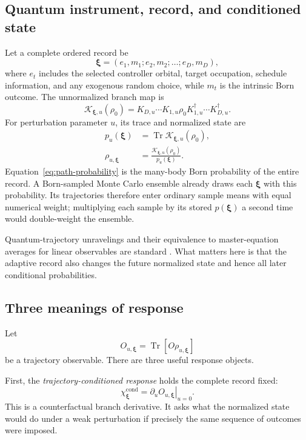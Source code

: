 \documentclass[aps,prb,onecolumn,nofootinbib,superscriptaddress]{revtex4-2}
\newcommand{\Tr}{\operatorname{Tr}}
\newcommand{\cK}{\mathcal{K}}
\newcommand{\bxi}{\bm{\xi}}
\newcommand{\cond}{\mathrm{cond}}
\begin{document}
\subsection{Quantum instrument, record, and conditioned state}

Let a complete ordered record be
\begin{equation}
  \bxi=(e_1,m_1;e_2,m_2;\ldots;e_D,m_D),
\end{equation}
where $e_t$ includes the selected controller orbital, target occupation,
schedule information, and any exogenous random choice, while $m_t$ is the
intrinsic Born outcome.  The unnormalized branch map is
\begin{equation}
  \cK_{\bxi,u}(\rho_0)
  =K_{D,u}\cdots K_{1,u}\rho_0
   K_{1,u}^{\dagger}\cdots K_{D,u}^{\dagger} .
\end{equation}
For perturbation parameter $u$, its trace and normalized state are
\begin{align}
  p_u(\bxi)&=\Tr\cK_{\bxi,u}(\rho_0),\label{eq:path-probability}\\
  \rho_{u,\bxi}&=\frac{\cK_{\bxi,u}(\rho_0)}{p_u(\bxi)} .
  \label{eq:conditional-state}
\end{align}
Equation~\eqref{eq:path-probability} is the many-body Born probability of the
entire record.  A Born-sampled Monte Carlo ensemble already draws each $\bxi$
with this probability.  Its trajectories therefore enter ordinary sample
means with equal numerical weight; multiplying each sample by its stored
$p(\bxi)$ a second time would double-weight the ensemble.

Quantum-trajectory unravelings and their equivalence to master-equation
averages for linear observables are standard
\cite{DalibardCastinMolmer1992,CarischRomitoZilberberg2023}.  What matters here
is that the adaptive record also changes the future normalized state and hence
all later conditional probabilities.

\subsection{Three meanings of response}

Let
\begin{equation}
  O_{u,\bxi}=\Tr[O\rho_{u,\bxi}]
\end{equation}
be a trajectory observable.  There are three useful response objects.

First, the \emph{trajectory-conditioned response} holds the complete record
fixed:
\begin{equation}
  \chi_{\bxi}^{\cond}
  =\left.\partial_u O_{u,\bxi}\right|_{u=0}.
  \label{eq:conditional-response}
\end{equation}
This is a counterfactual branch derivative.  It asks what the normalized state
would do under a weak perturbation if precisely the same sequence of outcomes
were imposed.
\end{document}
